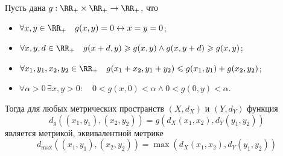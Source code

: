 \documentclass[12pt,a4paper]{article}
\begin{document}
    \begin{theorem}
        Пусть дана $g: \RR_+ \times \RR_+ \to \RR_+$, что
        \begin{itemize}
            \item $\forall x, y \in \RR_+\quad g(x, y) = 0 \leftrightarrow x = y = 0$;
            \item $\forall x, y, d \in \RR_+\quad g(x + d, y) \geqslant g(x, y) \wedge g(x, y + d) \geqslant g(x, y)$;
            \item $\forall x_1, y_1, x_2, y_2 \in \RR_+ \quad g(x_1 + x_2, y_1 + y_2) \leqslant g(x_1, y_1) + g(x_2, y_2)$;
            \item $\forall \alpha > 0\, \exists x, y > 0:\quad 0 < g(x, 0) < \alpha \wedge 0 < g(0, y) < \alpha$. 
        \end{itemize}
        Тогда для любых метрических пространств $(X, d_X)$ и $(Y, d_Y)$ функция
        \[
            d_g((x_1, y_1), (x_2, y_2)) = g(d_X(x_1, x_2), d_Y(y_1, y_2))
        \]
        является метрикой, эквивалентной метрике
        \[
            d_{\max}((x_1, y_1), (x_2, y_2)) = \max(d_X(x_1, x_2), d_Y(y_1, y_2))
        \]
    \end{theorem}
\end{document}
